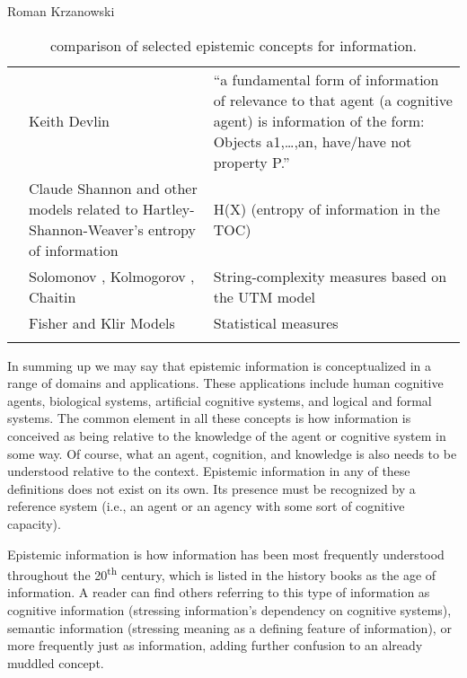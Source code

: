\begin{artengenv}{Roman Krzanowski}
\begin{small}
\begin{longtable}{p{}p{}p{}}
&
Keith Devlin
\parencite*[][]{devlin_logic_1991}%
 &
``a fundamental form of information of relevance to that agent (a cognitive agent) is information of the form: Objects a1,…,an, have/have not property P.''\\
&
Claude Shannon
\parencite*[][]{shannon_mathematical_1948} %
 and other models related to Hartley-Shannon-Weaver's entropy of information &
H(X) (entropy of information in the TOC)\\
&
Solomonov \parencite*[][]{solomonoff_algorithmic_2010},
Kolmogorov \parencite*[][]{kolmogorov_1965}, %
 Chaitin \parencite*{chaitin_algorithmic_1987} &
String-complexity measures based on the UTM model\\
&
Fisher and Klir
\parencite*[][]{klir_fuzzy_1988} %
 Models &
Statistical measures\\
\caption{comparison of selected epistemic concepts for information.}\label{tab2-krza}
\end{longtable}
\end{small}

In summing up we may say that epistemic information is conceptualized in a range of domains and applications. These applications include human cognitive agents, biological systems, artificial cognitive systems, and logical and formal systems. The common element in all these concepts is how information is conceived as being relative to the knowledge of the agent or cognitive system in some way. Of course, what an agent, cognition, and knowledge is also needs to be understood relative to the context. Epistemic information in any of these definitions does not exist on its own. Its presence must be recognized by a reference system (i.e., an agent or an agency with some sort of cognitive capacity).

Epistemic information is how information has been most frequently understood throughout the 20\textsuperscript{th} century, which is listed in the history books as the age of information. A reader can find others referring to this type of information as cognitive information (stressing information's dependency on cognitive systems), semantic information (stressing meaning as a defining feature of information), or more frequently just as information, adding further confusion to an already muddled concept.


\end{artengenv}

